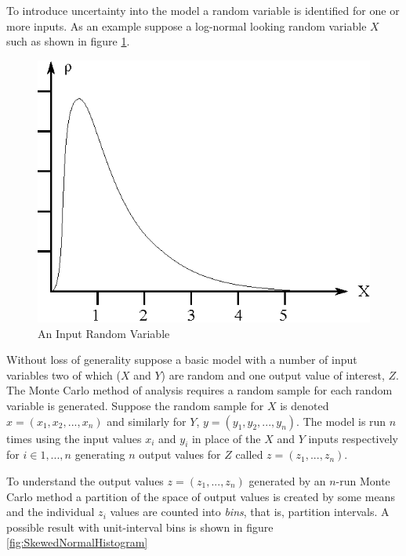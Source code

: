 To introduce uncertainty into the model a random variable is identified for one or more inputs. As an example suppose a log-normal looking random variable $X$ such as shown in figure \ref{fig:Lognormal}.

\begin{figure}
  \centering
  \includegraphics{Images/Lognormal.eps}
  \caption[An Input Random Variable]
          {An Input Random Variable}
  \label{fig:Lognormal}
\end{figure}

Without loss of generality suppose a basic model with a number of input variables two of which ($X$ and $Y$) are random and one output value of interest, $Z$. The Monte Carlo method of analysis requires a random sample for each random variable is generated. Suppose the random sample for $X$ is denoted $x = (x_1, x_2, ..., x_n)$ and similarly for $Y$, $y = (y_1, y_2, ..., y_n)$. The model is run $n$ times using the input values $x_i$ and $y_i$ in place of the $X$ and $Y$ inputs respectively for $i \in {1,...,n}$ generating $n$ output values for $Z$ called $z = (z_1, ..., z_n)$. 

To understand the output values $z = (z_1, ..., z_n)$ generated by an $n$-run Monte Carlo method a partition of the space of output values is created by some means and the individual $z_i$ values are counted into \emph{bins}, that is, partition intervals. A possible result with unit-interval bins is shown in figure \ref{fig:SkewedNormalHistogram}

